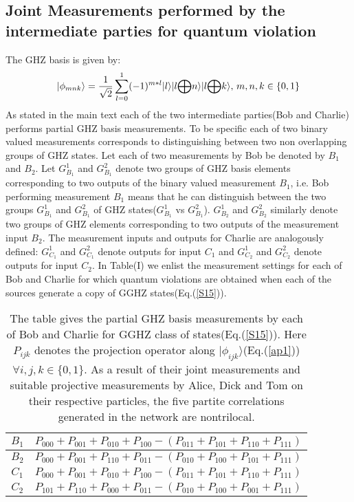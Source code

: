\documentclass[pra,10pt,twocolumn,superscriptaddress,floatfix,showpacs]{revtex4-1}
\begin{document}
\subsection{Joint Measurements performed by the intermediate parties for quantum violation}
The GHZ basis is given by:
\begin{equation}\label{ap1}
|\phi_{mnk}\rangle=\frac{1}{\sqrt{2}}\sum_{l=0}^1(-1)^{m*l}|l\rangle|l\small{\bigoplus} n \rangle |l\small{\bigoplus} k\rangle,\,m,n,k\in\{0,1\}
\end{equation}
As stated in the main text each of the two intermediate parties(Bob and Charlie) performs partial GHZ basis measurements. To be specific  each of two binary valued measurements corresponds to distinguishing between two non overlapping groups of GHZ states. Let each of two measurements by Bob be denoted by $B_1$ and $B_2$. Let $G_{B_1}^1$ and $G_{B_1}^2$ denote two groups of GHZ basis elements corresponding to two outputs of the binary valued measurement $B_1$, i.e. Bob performing measurement $B_1$ means that he can distinguish between the two groups $G_{B_1}^1$ and $G_{B_1}^2$ of GHZ states($G_{B_1}^1$ vs $G_{B_1}^2$). $G_{B_2}^1$ and $G_{B_2}^2$ similarly denote two groups of GHZ elements corresponding to two outputs of the measurement input $B_2$. The measurement inputs and outputs for Charlie  are analogously defined: $G_{C_1}^1$ and $G_{C_1}^2$ denote outputs for input $C_1$ and $G_{C_2}^1$ and $G_{C_2}^2$ denote outputs for input $C_2$. In Table(I) we enlist the measurement settings for each of Bob and Charlie for which quantum violations are obtained when each of the sources generate a copy of GGHZ  states(Eq.(\ref{S15})).
\begin{table}[htp]
\begin{center}
\begin{tabular}{|c|c|}
\hline
$B_1$&$P_{000}+P_{001}+P_{010}+P_{100}-(P_{011}+P_{101}+P_{110}+P_{111})$\\
\hline
$B_2$&$P_{000}+P_{001}+P_{110}+P_{011}-(P_{010}+P_{100}+P_{101}+P_{111})$\\
\hline
$C_1$&$P_{000}+P_{001}+P_{010}+P_{100}-(P_{011}+P_{101}+P_{110}+P_{111})$\\
\hline
$C_2$&$P_{101}+P_{110}+P_{000}+P_{011}-(P_{010}+P_{100}+P_{001}+P_{111})$\\
\hline
\end{tabular}\\
\caption{The table gives the partial GHZ basis measurements by each of Bob and Charlie for GGHZ class of states(Eq.(\ref{S15})). Here $P_{ijk}$ denotes the projection operator along $|\phi_{ijk}\rangle$(Eq.(\ref{ap1})) $\forall i,j,k\in\{0,1\}$. As a result of their joint measurements and suitable projective measurements by Alice, Dick and Tom on their respective particles, the five partite correlations generated in the network are nontrilocal. }
\end{center}
\label{table1}
\end{table}
\end{document}

